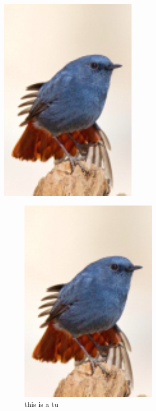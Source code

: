 \documentclass{book} %
\begin{document}
\includegraphics{pic1.jpg}
\begin{figure}
\centering
	\includegraphics[scale=1,angle=30]{pic1.jpg}
	\caption{this is a tu}
\end{figure}
\end{document}
